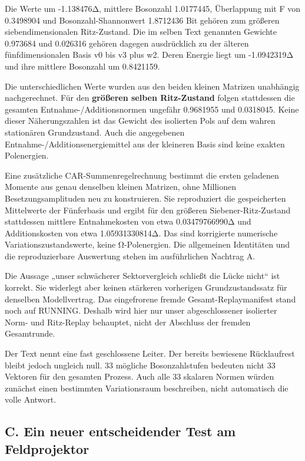 Die Werte um -1.138476Δ, mittlere Bosonzahl 1.0177445, Überlappung mit F
von 0.3498904 und Bosonzahl-Shannonwert 1.8712436 Bit gehören zum
größeren siebendimensionalen Ritz-Zustand. Die im selben Text genannten
Gewichte 0.973684 und 0.026316 gehören dagegen ausdrücklich zu der
älteren fünfdimensionalen Basis v0 bis v3 plus w2. Deren Energie liegt
um -1.0942319Δ und ihre mittlere Bosonzahl um 0.8421159.

Die unterschiedlichen Werte wurden aus den beiden kleinen Matrizen
unabhängig nachgerechnet. Für den \textbf{größeren selben Ritz-Zustand}
folgen stattdessen die gesamten Entnahme-/Additionsnormen ungefähr
0.9681955 und 0.0318045. Keine dieser Näherungszahlen ist das Gewicht
des isolierten Pols auf dem wahren stationären Grundzustand. Auch die
angegebenen Entnahme-/Additionsenergiemittel aus der kleineren Basis
sind keine exakten Polenergien.

Eine zusätzliche CAR-Summenregelrechnung bestimmt die ersten geladenen
Momente aus genau denselben kleinen Matrizen, ohne Millionen
Besetzungsamplituden neu zu konstruieren. Sie reproduziert die
gespeicherten Mittelwerte der Fünferbasis und ergibt für den größeren
Siebener-Ritz-Zustand stattdessen mittlere Entnahmekosten von etwa
0.03479766990Δ und Additionskosten von etwa 1.05931330814Δ. Das sind
korrigierte numerische Variationszustandswerte, keine Ω-Polenergien. Die
allgemeinen Identitäten und die reproduzierbare Auswertung stehen im
ausführlichen Nachtrag A.

Die Aussage „unser schwächerer Sektorvergleich schließt die Lücke
nicht`` ist korrekt. Sie widerlegt aber keinen stärkeren vorherigen
Grundzustandssatz für denselben Modellvertrag. Das eingefrorene fremde
Gesamt-Replaymanifest stand noch auf RUNNING. Deshalb wird hier nur
unser abgeschlossener isolierter Norm- und Ritz-Replay behauptet, nicht
der Abschluss der fremden Gesamtrunde.

Der Text nennt eine fast geschlossene Leiter. Der bereits bewiesene
Rücklaufrest bleibt jedoch ungleich null. 33 mögliche Bosonzahlstufen
bedeuten nicht 33 Vektoren für den gesamten Prozess. Auch alle 33
skalaren Normen würden zunächst einen bestimmten Variationsraum
beschreiben, nicht automatisch die volle Antwort.

\subsection{C. Ein neuer entscheidender Test am
Feldprojektor}\label{c.-ein-neuer-entscheidender-test-am-feldprojektor}

